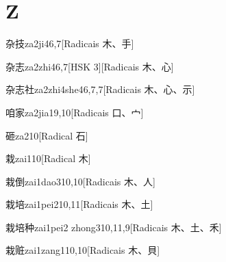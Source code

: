 
\section*{Z}

\begin{entry}{杂技}{za2ji4}{6,7}[Radicais ⽊、⼿]
\end{entry}

\begin{entry}{杂志}{za2zhi4}{6,7}[HSK 3][Radicais ⽊、⼼]
\end{entry}

\begin{entry}{杂志社}{za2zhi4she4}{6,7,7}[Radicais ⽊、⼼、⽰]
\end{entry}

\begin{entry}{咱家}{za2jia1}{9,10}[Radicais ⼝、⼧]
\end{entry}

\begin{entry}{砸}{za2}{10}[Radical ⽯]
\end{entry}

\begin{entry}{栽}{zai1}{10}[Radical ⽊]
\end{entry}

\begin{entry}{栽倒}{zai1dao3}{10,10}[Radicais ⽊、⼈]
\end{entry}

\begin{entry}{栽培}{zai1pei2}{10,11}[Radicais ⽊、⼟]
\end{entry}

\begin{entry}{栽培种}{zai1pei2 zhong3}{10,11,9}[Radicais ⽊、⼟、⽲]
\end{entry}

\begin{entry}{栽赃}{zai1zang1}{10,10}[Radicais ⽊、⾙]
\end{entry}

